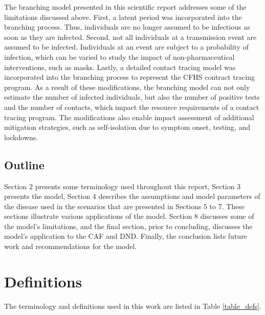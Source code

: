 \documentclass[sr]{drdc-report}
\begin{document}
The branching model presented in this scientific report addresses some of the limitations discussed above. First, a latent period was incorporated into the branching process. Thus, individuals are no longer assumed to be infectious as soon as they are infected. Second, not all individuals at a transmission event are assumed to be infected. Individuals at an event are subject to a probability of infection, which can be varied to study the impact of non-pharmaceutical interventions, such as masks. Lastly, a detailed contact tracing model was incorporated into the branching process to represent the CFHS contract tracing program. As a result of these modifications, the branching model can not only estimate the number of infected individuals, but also the number of positive tests and the number of contacts, which impact the resource requirements of a contact tracing program. The modifications also enable impact assessment of additional mitigation strategies, such as self-isolation due to symptom onset, testing, and lockdowns. 

 

\subsection{Outline} 

 

Section 2 presents some terminology used throughout this report, Section 3 presents the model, Section 4 describes the assumptions and model parameters of the disease used in the scenarios that are presented in Sections 5 to 7. These sections illustrate various applications of the model. Section 8 discusses some of the model’s limitations, and the final section, prior to concluding, discusses the model’s application to the CAF and DND. Finally, the conclusion lists future work and recommendations for the model.

\section{Definitions}\label{Definitions_section_label}
The terminology and definitions used in this work are listed in Table \ref{table_defs}.





\end{document}
